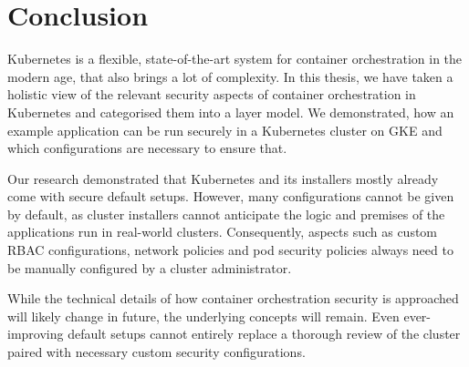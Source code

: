 \chapter{Conclusion} \label{chap:conclusion}

Kubernetes is a flexible, state-of-the-art system for container orchestration in the modern age, that also brings a lot of complexity. In this thesis, we have taken a holistic view of the relevant security aspects of container orchestration in Kubernetes and categorised them into a layer model. We demonstrated, how an example application can be run securely in a Kubernetes cluster on \acf{GKE} and which configurations are necessary to ensure that. 

Our research demonstrated that Kubernetes and its installers mostly already come with secure default setups. However, many configurations cannot be given by default, as cluster installers cannot anticipate the logic and premises of the applications run in real-world clusters. Consequently, aspects such as  custom \ac{RBAC} configurations, network policies and pod security policies always need to be manually configured by a cluster administrator. 

While the technical details of how container orchestration security is approached will likely change in future, the underlying concepts will remain. Even ever-improving default setups cannot entirely replace a thorough review of the cluster paired with necessary custom security configurations.

